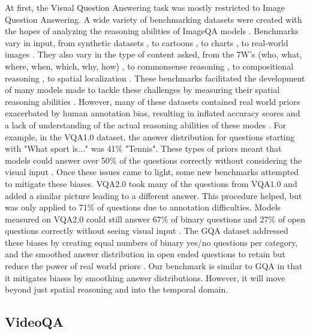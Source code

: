 \documentclass{article}
\begin{document}
At first, the Visual Question Answering task was mostly restricted to Image Question Answering. A wide variety of benchmarking datasets were created with the hopes of analyzing the reasoning abilities of ImageQA models \cite{johnson2017clevr, hudson2019gqa, antol2015vqa, zellers2019recognition, goyal2017making, krishna2017visual, zhu2016visual7w, kim2020answering}. Benchmarks vary in input, from synthetic datasets \cite{johnson2017clevr}, to cartoons \cite{antol2015vqa}, to charts \cite{kim2017deepstory}, to real-world images \cite{hudson2019gqa, krishna2017visual, zhu2016visual7w, goyal2017making, zellers2019recognition, antol2015vqa}. They also vary in the type of content asked, from the 7W's (who, what, where, when, which, why, how) \cite{zhu2016visual7w}, to commonsense reasoning \cite{zellers2019recognition}, to compositional reasoning \cite{johnson2017clevr, hudson2019gqa}, to spatial localization \cite{zhu2016visual7w, krishna2017visual, hudson2019gqa}. These benchmarks facilitated the development of many models made to tackle these challenges by measuring their spatial reasoning abilities \cite{}. However, many of these datasets contained real world priors exacerbated by human annotation bias, resulting in inflated accuracy scores and a lack of understanding of the actual reasoning abilities of these modes \cite{goyal2017making, hudson2019gqa}. For example, in the VQA1.0 dataset, the answer distribution for questions starting with "What sport is..." was 41\% "Tennis". These types of priors meant that models could answer over 50\% of the questions correctly without considering the visual input \cite{goyal2017making}. Once these issues came to light, some new benchmarks attempted to mitigate these biases. VQA2.0 took many of the questions from VQA1.0 and added a similar picture leading to a different answer. This procedure helped, but was only applied to 71\% of questions due to annotation difficulties. Models measured on VQA2.0 could still answer 67\% of binary questions and 27\% of open questions correctly without seeing visual input \cite{hudson2019gqa}. The GQA dataset addressed these biases by creating equal numbers of binary yes/no questions per category, and the smoothed answer distribution in open ended questions to retain but reduce the power of real world priors \cite{hudson2019gqa}. Our benchmark is similar to GQA in that it mitigates biases by smoothing answer distributions. However, it will move beyond just spatial reasoning and into the temporal domain. 

\subsection{VideoQA}
\end{document}
